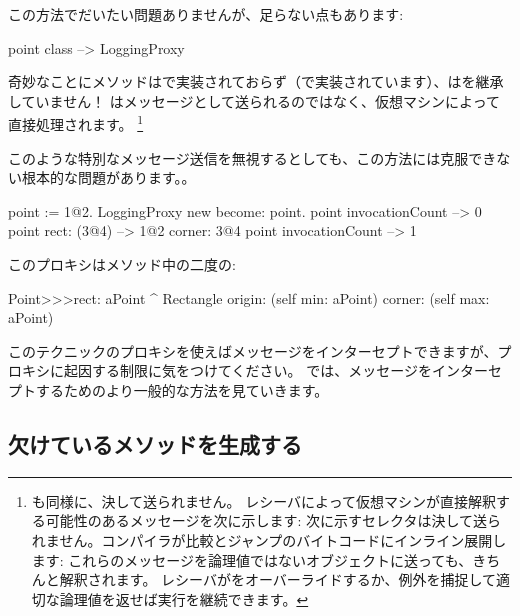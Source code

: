 \documentclass[a4paper,10pt,twoside]{book}
\begin{document}
この方法でだいたい問題ありませんが、足らない点もあります:
\begin{code}{}
point class --> LoggingProxy
\end{code}
奇妙なことにメソッドはで実装されておらず（で実装されています）、はを継承していません！
はメッセージとして送られるのではなく、仮想マシンによって直接処理されます。
\footnote{も同様に、決して送られません。
レシーバによって仮想マシンが直接解釈する可能性のあるメッセージを次に示します:
\ct{+- < > <= >= = ~= * / \ ==}
次に示すセレクタは決して送られません。コンパイラが比較とジャンプのバイトコードにインライン展開します:
これらのメッセージを論理値ではないオブジェクトに送っても、きちんと解釈されます。
レシーバがをオーバーライドするか、例外を捕捉して適切な論理値を返せば実行を継続できます。
}%

このような特別なメッセージ送信を無視するとしても、この方法には克服できない根本的な問題があります。。
\begin{code}{}
point := 1@2.
LoggingProxy new become: point.
point invocationCount --> 0
point rect: (3@4)        --> 1@2 corner: 3@4
point invocationCount --> 1
\end{code}

このプロキシはメソッド中の二度の:
\begin{code}{}
Point>>>rect: aPoint 
	^ Rectangle  origin: (self min: aPoint) corner: (self max: aPoint)
\end{code}

このテクニックのプロキシを使えばメッセージをインターセプトできますが、プロキシに起因する制限に気をつけてください。
では、メッセージをインターセプトするためのより一般的な方法を見ていきます。

\subsection{欠けているメソッドを生成する}
\end{document}
